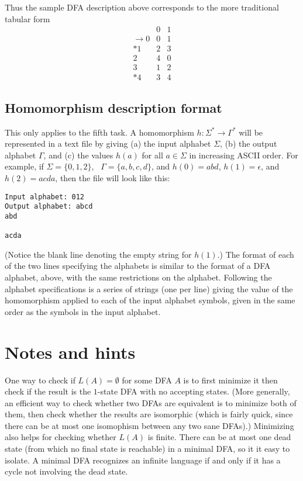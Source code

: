 Thus the sample DFA description above corresponds to the more
traditional tabular form
\[ \begin{array}{r|cc}
& 0 & 1 \\ \hline
\rightarrow 0 & 0 & 1 \\
{*}1 & 2 & 3 \\
2 & 4 & 0 \\
3 & 1 & 2 \\
{*}4 & 3 & 4
\end{array} \]

\subsection*{Homomorphism description format}

This only applies to the fifth task.
A homomorphism $h:\Sigma^*\rightarrow\Gamma^*$ will be represented in
a text file by giving
(a) the input alphabet $\Sigma$,
(b) the output alphabet $\Gamma$, and
(c) the values $h(a)$ for all $a\in\Sigma$ in increasing ASCII order.
For example, if $\Sigma = \{0,1,2\}$, \ $\Gamma = \{a,b,c,d\}$,
and $h(0) = abd$, $h(1) = \epsilon$, and $h(2) = acda$, then the
file will look like this:
\begin{verbatim}
Input alphabet: 012
Output alphabet: abcd
abd

acda
\end{verbatim}
(Notice the blank line denoting the empty string for $h(1)$.)
The format of each of the two lines specifying the alphabets is similar
to the format of a DFA alphabet, above, with the same restrictions on
the alphabet.
Following the alphabet specifications is a series of strings (one per
line) giving the value of the homomorphism applied to each of the
input alphabet symbols, given in the same order as the symbols in the
input alphabet.

\section*{Notes and hints}

One way to check if $L(A)=\emptyset$ for some DFA $A$ is to first minimize
it then check if the result is the $1$-state DFA with no accepting states.
(More generally, an efficient way to check whether two DFAs are equivalent
is to minimize both of them, then check whether the results are isomorphic
(which is fairly quick, since there can be at most one isomophism between
any two sane DFAs).)
Minimizing also helps for checking whether $L(A)$ is finite.
There can be at most one dead state (from which no final state is reachable)
in a minimal DFA, so it it easy to isolate.
A minimal DFA recognizes an infinite language if and only if it has a
cycle not involving the dead state.

